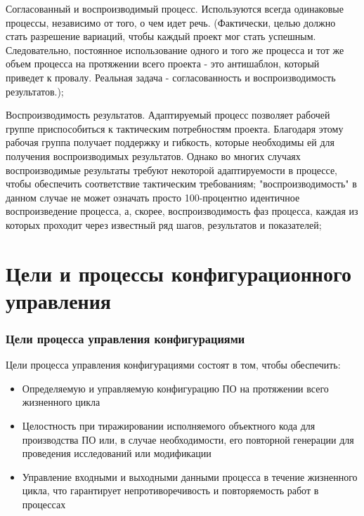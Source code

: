\documentclass{../industrial-development}
\begin{document}
\lecturenotes
Согласованный и воспроизводимый процесс. Используются всегда одинаковые процессы, независимо от того, о чем идет речь. (Фактически, целью должно стать разрешение вариаций, чтобы каждый проект мог стать успешным. Следовательно, постоянное использование одного и того же процесса и тот же объем процесса на протяжении всего проекта - это антишаблон, который приведет к провалу. Реальная задача - согласованность и воспроизводимость результатов.);

Воспроизводимость результатов. Адаптируемый процесс позволяет рабочей группе приспособиться к тактическим потребностям проекта. Благодаря этому рабочая группа получает поддержку и гибкость, которые необходимы ей для получения воспроизводимых результатов. Однако во многих случаях воспроизводимые результаты требуют некоторой адаптируемости в процессе, чтобы обеспечить соответствие тактическим требованиям; "воспроизводимость" в данном случае не может означать просто 100-процентно идентичное воспроизведение процесса, а, скорее, воспроизводимость фаз процесса, каждая из которых проходит через известный ряд шагов, результатов и показателей; 
~\cite{Instruments}

\section{Цели и процессы конфигурационного управления}
\begin{frame} \frametitle{Цели процесса управления конфигурациями}
 
	   \begin{block}{Цели процесса управления конфигурациями состоят в том, чтобы обеспечить:
		}
  		 \begin{itemize}
\item Определяемую и управляемую конфигурацию ПО на протяжении всего жизненного цикла
\item Целостность при тиражировании исполняемого объектного кода для производства ПО или, в случае необходимости, его повторной генерации для проведения исследований или модификации
\item Управление входными и выходными данными процесса в течение жизненного цикла, что гарантирует непротиворечивость и повторяемость работ в процессах

  \end{itemize}
 \end{block}
\end{frame}
\end{document}
